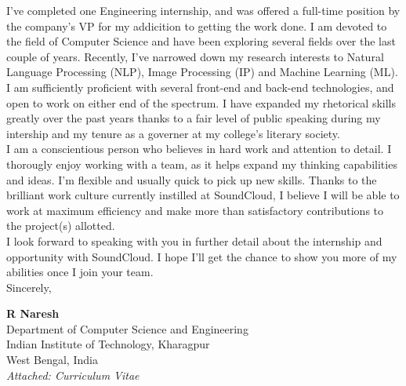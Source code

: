 \documentclass[a4paper,10pt]{extarticle} %
\begin{document}
I’ve completed one Engineering internship, and was offered a full-time position by the company's VP for my addicition to getting the work done. I am devoted to the field of Computer Science and have been exploring several fields over the last couple of years. Recently, I've narrowed down my research interests to Natural Language Processing (NLP), Image Processing (IP) and Machine Learning (ML). I am sufficiently proficient with several front-end and back-end technologies, and open to work on either end of the spectrum. I have expanded my rhetorical skills greatly over the past years thanks to a fair level of public speaking during my intership and my tenure as a governer at my college's literary society. \\

I am a conscientious person who believes in hard work and attention to detail. I thorougly enjoy working with a team, as it helps expand my thinking capabilities and ideas. I'm flexible and usually quick to pick up new skills. Thanks to the brilliant work culture currently instilled at SoundCloud, I believe I will be able to work at maximum efficiency and make more than satisfactory contributions to the project(s) allotted.\\

I look forward to speaking with you in further detail about the internship and opportunity with SoundCloud. I hope I’ll get the chance to show you more of my abilities once I join your team.\\

Sincerely,

\textbf{\large{R Naresh}}\\
Department of Computer Science and Engineering\\
Indian Institute of Technology, Kharagpur\\
West Bengal, India\\

\itshape{Attached: Curriculum Vitae}
\end{document}
